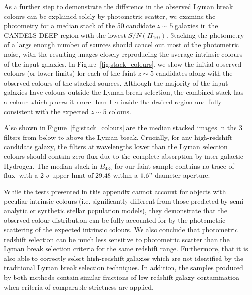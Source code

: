 As a further step to demonstrate the difference in the observed Lyman break colours can be explained solely by photometric scatter, we examine the photometry for a median stack of the 50 candidate $z \sim 5$ galaxies in the CANDELS DEEP region with the lowest $S/N(H_{160})$. Stacking the photometry of a large enough number of sources should cancel out most of the photometric noise, with the resulting images closely reproducing the average intrinsic colours of the input galaxies. In Figure~\ref{fig:stack_colours}, we show the initial observed colours (or lower limits) for each of the faint $z\sim5$ candidates along with the observed colours of the stacked sources. Although the majority of the input galaxies have colours outside the Lyman break selection, the combined stack has a colour which places it more than 1-$\sigma$ inside the desired region and fully consistent with the expected $z \sim 5$ colours.

Also shown in Figure~\ref{fig:stack_colours} are the median stacked images in the 3 filters from below to above the Lyman break. Crucially, for any high-redshift candidate galaxy, the filters at wavelengths lower than the Lyman selection colours should contain zero flux due to the complete absorption by inter-galactic Hydrogen. The median stack in $B_{435}$ for our faint sample contains no trace of flux, with a 2-$\sigma$ upper limit of $29.48$ within a $0.6"$ diameter aperture.

While the tests presented in this appendix cannot account for objects with peculiar intrinsic colours (i.e. significantly different from those predicted by semi-analytic or synthetic stellar population models), they demonstrate that the observed colour distribution can be fully accounted for by the photometric scattering of the expected intrinsic colours. We also conclude that photometric redshift selection can be much less sensitive to photometric scatter than the Lyman break selection criteria for the same redshift range. Furthermore, that it is also able to correctly select high-redshift galaxies which are not identified by the traditional Lyman break selection techniques. In addition, the samples produced by both methods contain similar fractions of low-redshift galaxy contamination when criteria of comparable strictness are applied.


